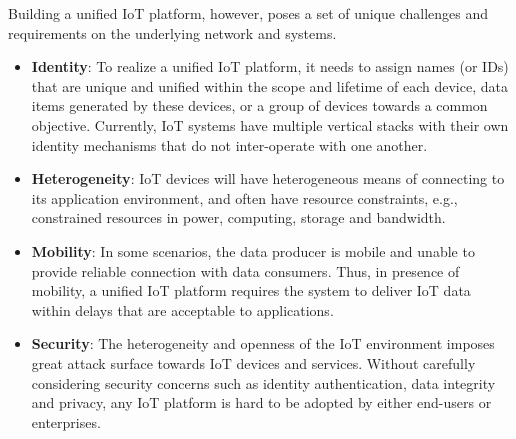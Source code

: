 Building a unified IoT platform, however, poses a set of unique challenges and requirements on the underlying network and systems.
\begin{itemize}
\vspace{1mm}\item{\bf Identity}:
To realize a unified IoT platform, 
it needs to assign names (or IDs) that are unique and unified within the scope and lifetime of each device, data items generated by these devices, or a group of devices towards a common objective. Currently, IoT systems have multiple vertical stacks with their own identity mechanisms that do not inter-operate with one another.

\vspace{1mm}\item{\bf Heterogeneity}:
IoT devices will have heterogeneous means of connecting to its application environment, and often have resource constraints, e.g., constrained resources in power, computing, storage and bandwidth.

\vspace{1mm}\item{\bf Mobility}:
In some scenarios, the data producer is mobile and unable to provide reliable connection with data consumers. Thus, in presence of mobility, a unified IoT platform requires the system to deliver IoT data within delays that are acceptable to applications.

\vspace{1mm}\item{\bf Security}:
The heterogeneity and openness of the IoT environment imposes great attack surface towards IoT devices and services. Without carefully considering security concerns such as identity authentication, data integrity and privacy, any IoT platform is hard to be adopted by either end-users or enterprises.
\end{itemize}

